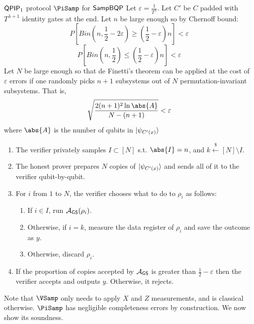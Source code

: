 \begin{protocol}{$\operatorname{\mathsf{QPIP}}_1$ protocol $\PiSamp$ for $\operatorname{\mathsf{SampBQP}}$}
	\label{ProtoQPIP1}
	Let $\varepsilon=\frac{1}{T^\lambda}$.
	Let $C'$ be $C$ padded with $T^{\lambda + 1}$ identity gates at the end.
	Let $n$ be large enough so by Chernoff bound:
		$$P\left[Bin(n, \frac{1}{2}-2\varepsilon)\geq\left(\frac{1}{2}-\varepsilon\right)n\right]<\varepsilon$$
		$$P\left[Bin(n, \frac{1}{2})\leq\left(\frac{1}{2}-\varepsilon\right)n\right]<\varepsilon$$
	Let $N$ be large enough so that de Finetti's theorem can be applied at the cost of $\varepsilon$ errors if one randomly picks $n+1$ subsystems out of $N$ permutation-invariant subsystems.
		That is,
		$$\sqrt{\frac{2(n+1)^2\ln\abs{A}}{N-(n+1)}}<\varepsilon$$
		where $\abs{A}$ is the number of qubits in $\ket{\psi_{C'(x)}}$
	\begin{enumerate}
		\item The verifier privately samples $I\subset[N]$ s.t. $\abs{I}=n$, and $k\xleftarrow{\$}[N]\setminus I$.
		\item The honest prover prepares $N$ copies of $\ket{\psi_{C'(x)}}$ and sends all of it to the verifier qubit-by-qubit.
		\item For $i$ from $1$ to $N$, the verifier chooses what to do to $\rho_i$ as follows:
		\begin{enumerate}
			\item If $i\in I$, run $\mathcal{A}_{\mathsf{GS}}(\rho_i)$.
			\item Otherwise, if $i=k$, measure the data register of $\rho_i$ and save the outcome as $y$.
			\item Otherwise, discard $\rho_i$.
		\end{enumerate}
		\item If the proportion of copies accepted by $\mathcal{A}_{\mathsf{GS}}$ is greater than $\frac{1}{2}-\varepsilon$ then the verifier accepts and outputs $y$. Otherwise, it rejects.
	\end{enumerate}
\end{protocol}

Note that $\VSamp$ only needs to apply $X$ and $Z$ measurements, and is classical otherwise. $\PiSamp$ has negligible completeness errors by construction. We now show its soundness.

